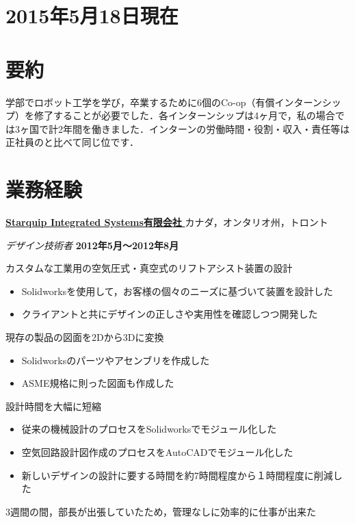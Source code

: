 \documentclass[10pt, a4paper]{article}
\def\xeCJKembold{0.15}
\def\saveCJKnode{\dimen255\lastkern}
\def\restoreCJKnode{\kern-\dimen255\kern\dimen255}
\let\CJKoldsymbol\CJKsymbol
\let\CJKoldpunctsymbol\CJKpunctsymbol
\def\CJKfakeboldsymbol#1{%
\special{pdf:literal direct 2 Tr \xeCJKembold\space w}%
\CJKoldsymbol{#1}%
\saveCJKnode
\special{pdf:literal direct 0 Tr}%
\restoreCJKnode}
\def\CJKfakeboldpunctsymbol#1{%
\special{pdf:literal direct 2 Tr \xeCJKembold\space w}%
\CJKoldpunctsymbol{#1}%
\saveCJKnode
\special{pdf:literal direct 0 Tr}%
\restoreCJKnode}
\newcommand\CJKfakebold[1]{%
\let\CJKsymbol\CJKfakeboldsymbol
\let\CJKpunctsymbol\CJKfakeboldpunctsymbol
#1%
\let\CJKsymbol\CJKoldsymbol
\let\CJKpunctsymbol\CJKoldpunctsymbol}
\begin{document}
\thispagestyle{plain}

\section{\footnotesize{2015年5月18日現在}}

\section{要約}

学部でロボット工学を学び，卒業するために6個のCo-op（有償インターンシップ）を修了することが必要でした．各インターンシップは4ヶ月で，私の場合では3ヶ国で計2年間を働きました．インターンの労働時間・役割・収入・責任等は正社員のと比べて同じ位です．

\section{業務経験}
\href{http://starquip.com/}{\CJKfakebold{\textbf{Starquip Integrated Systems有限会社}}}\hfill カナダ，オンタリオ州，トロント

\begin{outerlist}
\item[] \textit{デザイン技術者} \hfill \textbf{2012年5月〜2012年8月}
  \begin{innerlist}
  \item カスタムな工業用の空気圧式・真空式のリフトアシスト装置の設計
  \begin{itemize}
    \item Solidworksを使用して，お客様の個々のニーズに基づいて装置を設計した
    \item クライアントと共にデザインの正しさや実用性を確認しつつ開発した
  \end{itemize}
  \item 現存の製品の図面を2Dから3Dに変換
  \begin{itemize}
    \item Solidworksのパーツやアセンブリを作成した
    \item ASME規格に則った図面も作成した
  \end{itemize}
  \item 設計時間を大幅に短縮
  \begin{itemize}
    \item 従来の機械設計のプロセスをSolidworksでモジュール化した
    \item 空気回路設計図作成のプロセスをAutoCADでモジュール化した
    \item 新しいデザインの設計に要する時間を約7時間程度から１時間程度に削減した
  \end{itemize}
  \item 3週間の間，部長が出張していたため，管理なしに効率的に仕事が出来た
  \end{innerlist}
\end{outerlist}
\end{document}
